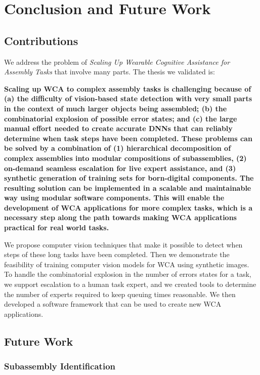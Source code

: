 \chapter{Conclusion and Future Work}\label{chap:conclusion}

\section{Contributions}

We address the problem of \textit{Scaling Up Wearable Cognitive Assistance for
  Assembly Tasks} that involve many parts.
The thesis we validated is:

\textbf{
  Scaling up WCA to complex assembly tasks is challenging because of
  (a) the difficulty of
  vision-based state detection with very small parts in the context of much
  larger objects being assembled; (b) the combinatorial explosion
  of possible error states; and (c) the large manual effort needed to create
  accurate DNNs that can reliably determine when task steps have been completed.
  These problems can be solved by a combination of (1) hierarchical
  decomposition of
  complex assemblies into modular compositions of subassemblies, (2) on-demand
  seamless
  escalation for live expert assistance, and (3) synthetic generation of
  training
  sets for born-digital components. The resulting solution can be implemented in
  a scalable and maintainable way using modular software components.
  This will enable the development of WCA applications for more complex tasks,
  which is a necessary step along the path towards making WCA applications
  practical for real world tasks.
}

We propose computer vision techniques that make it possible to detect when steps
of these long tasks have been completed.
Then we demonstrate the feasibility of training computer vision models for WCA
using synthetic images.
To handle the combinatorial explosion in the number of errors states for a task,
we support escalation to a human task expert, and we created tools to determine
the number of experts required to keep queuing times reasonable.
We then developed a software framework that can be used to create new WCA
applications.

\section{Future Work}

\subsection{Subassembly Identification}

